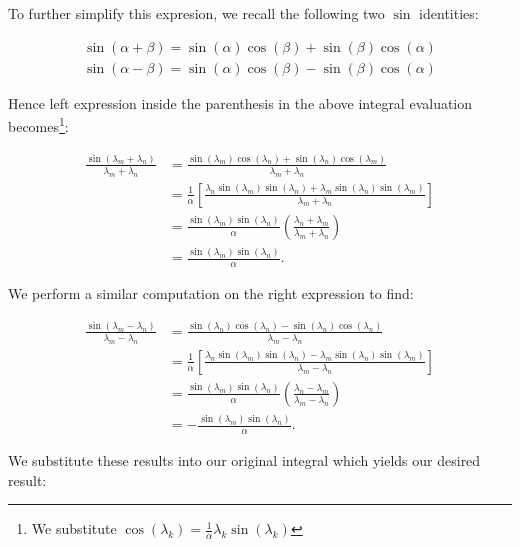\begin{solution}
    \pagebreak
    To further simplify this expresion, we recall the following two $\sin$ identities:

    \begin{align*}
        \sin{(\alpha + \beta)} = \sin{(\alpha)}\cos{(\beta)} + \sin{(\beta)}\cos{(\alpha)} \\
        \sin{(\alpha - \beta)} = \sin{(\alpha)}\cos{(\beta)} - \sin{(\beta)}\cos{(\alpha)}
    \end{align*}

    Hence left expression inside the parenthesis in the above integral evaluation becomes\footnote[\dagger]{
        We substitute $\cos{(\lambda_k)} = \frac{1}{\alpha} \lambda_k \sin{(\lambda_k)}$
    }:

    \begin{align*}
        \frac{\sin{(\lambda_m + \lambda_n)}}{\lambda_m + \lambda_n}
        &= \frac{\sin{(\lambda_m)} \cos{(\lambda_n) + \sin{(\lambda_n)}} \cos{(\lambda_m)}}{\lambda_m + \lambda_n} \\
        &= \frac{1}{\alpha} \left[ \frac{\lambda_n \sin{(\lambda_m)} \sin{(\lambda_n) + \lambda_m} \sin{(\lambda_n)} \sin{(\lambda_m)}}{\lambda_m + \lambda_n} \right] \\
        &= \frac{\sin{(\lambda_m)} \sin{(\lambda_n)}}{\alpha} \left( \frac{\lambda_n + \lambda_m}{\lambda_m + \lambda_n} \right) \\
        &= \frac{\sin{(\lambda_m)} \sin{(\lambda_n)}}{\alpha}.
    \end{align*}
    
    We perform a similar computation on the right expression to find:

    \begin{align*}
        \frac{\sin{(\lambda_m - \lambda_n)}}{\lambda_m - \lambda_n}
        &= \frac{\sin{(\lambda_n)} \cos{(\lambda_n) - \sin{(\lambda_n)}} \cos{(\lambda_n)}}{\lambda_m - \lambda_n} \\
        &= \frac{1}{\alpha} \left[ \frac{\lambda_n \sin{(\lambda_m)} \sin{(\lambda_n) - \lambda_m} \sin{(\lambda_n)} \sin{(\lambda_m)}}{\lambda_m - \lambda_n} \right] \\
        &= \frac{\sin{(\lambda_m)} \sin{(\lambda_n)}}{\alpha} \left( \frac{\lambda_n - \lambda_m}{\lambda_m - \lambda_n} \right) \\
        &= -\frac{\sin{(\lambda_m)} \sin{(\lambda_n)}}{\alpha}.
    \end{align*}

    We substitute these results into our original integral which yields our desired result:



\end{solution}
